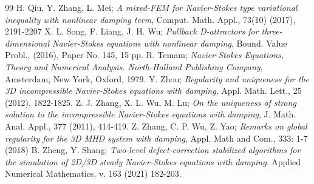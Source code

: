 \documentclass[10pt,a4paper]{amsart}
\numberwithin{equation}{section}
\begin{document}
\begin{thebibliography}{99}
 H. Qiu, Y. Zhang, L. Mei; \emph{A mixed-FEM for Navier-Stokes type variational inequality with nonlinear damping term}, Comput. Math. Appl., 73(10) (2017), 2191-2207
 X. L. Song, F. Liang, J. H. Wu; \emph{Pullback D-attractors for three-dimensional Navier-Stokes equations with nonlinear damping}, Bound. Value Probl., (2016), Paper No. 145, 15 pp.
 R. Temam; \emph{Navier-Stokes Equations, Theory and Numerical Analysis. North-Holland Publishing Company}, Amsterdam, New York, Oxford, 1979.
 Y. Zhou; \emph{Regularity and uniqueness for the 3D incompressible Navier-Stokes equations with damping}, Appl. Math. Lett., 25 (2012), 1822-1825.
 Z. J. Zhang, X. L. Wu, M. Lu; \emph{On the uniqueness of strong solution to the incompressible Navier-Stokes equations with damping}, J. Math. Anal. Appl., 377 (2011), 414-419.
 Z. Zhang, C. P. Wu, Z. Yao; \emph{Remarks on global regularity for the 3D MHD system with damping}, Appl. Math and Com., 333: 1-7 (2018)
 B. Zheng, Y. Shang; \emph{Two-level defect-correction stabilized algorithms for the simulation of 2D/3D steady Navier-Stokes equations with damping}. Applied Numerical Mathematics, v. 163 (2021) 182-203.
\end{thebibliography}
\end{document}

